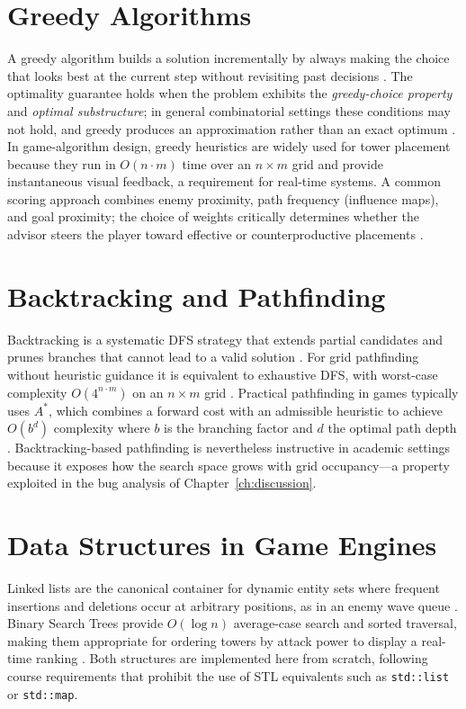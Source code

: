 \documentclass[12pt,a4paper]{report}
\begin{document}
\section{Greedy Algorithms}

A greedy algorithm builds a solution incrementally by always making the choice
that looks best at the current step without revisiting past decisions
\cite{cormen2022algorithms}.
The optimality guarantee holds when the problem exhibits the \textit{greedy-choice
property} and \textit{optimal substructure}; in general combinatorial settings
these conditions may not hold, and greedy produces an approximation rather than
an exact optimum \cite{cormen2022algorithms}.
In game-algorithm design, greedy heuristics are widely used for tower placement because they
run in $O(n \cdot m)$ time over an $n \times m$ grid and provide instantaneous
visual feedback, a requirement for real-time systems.
A common scoring approach combines enemy proximity, path frequency (influence
maps), and goal proximity; the choice of weights critically determines whether
the advisor steers the player toward effective or counterproductive placements
\cite{cormen2022algorithms}.

\section{Backtracking and Pathfinding}

Backtracking is a systematic DFS strategy that extends partial candidates and
prunes branches that cannot lead to a valid solution \cite{cormen2022algorithms}.
For grid pathfinding without heuristic guidance it is equivalent to exhaustive
DFS, with worst-case complexity $O(4^{n \cdot m})$ on an $n \times m$
grid \cite{cormen2022algorithms}.
Practical pathfinding in games typically uses $A^*$, which combines a
forward cost with an admissible heuristic to achieve $O(b^d)$ complexity
where $b$ is the branching factor and $d$ the optimal path depth
\cite{hart1968astar}.
Backtracking-based pathfinding is nevertheless instructive in academic settings
because it exposes how the search space grows with grid occupancy---a property
exploited in the bug analysis of Chapter~\ref{ch:discussion}.

\section{Data Structures in Game Engines}

Linked lists are the canonical container for dynamic entity sets where frequent
insertions and deletions occur at arbitrary positions, as in an enemy wave queue
\cite{cormen2022algorithms}.
Binary Search Trees provide $O(\log n)$ average-case search and sorted
traversal, making them appropriate for ordering towers by attack power to
display a real-time ranking \cite{cormen2022algorithms}.
Both structures are implemented here from scratch, following course requirements
that prohibit the use of STL equivalents such as \texttt{std::list} or
\texttt{std::map}.
\end{document}
